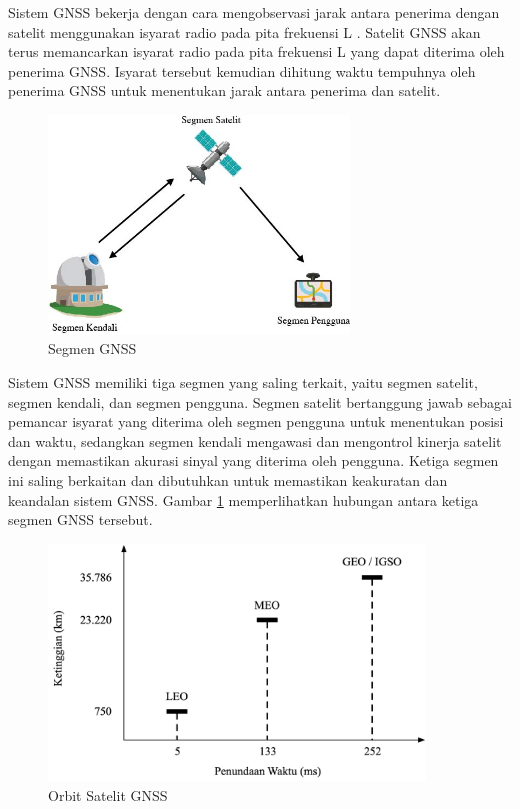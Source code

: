 Sistem GNSS bekerja dengan cara mengobservasi jarak antara penerima dengan satelit menggunakan isyarat radio pada pita frekuensi L \cite{TheEuropeanGlobalNavigationSatelliteSystemsAgency2021}. Satelit GNSS akan terus memancarkan isyarat radio pada pita frekuensi L yang dapat diterima oleh penerima GNSS. Isyarat tersebut kemudian dihitung waktu tempuhnya oleh penerima GNSS untuk menentukan jarak antara penerima dan satelit. 

\begin{figure}[H]
	\centering
	\includegraphics[width=8cm]{contents/chapter-2/gnss_segment.jpg}
	\caption{Segmen GNSS}
	\label{Fig: gnss_segment}
\end{figure}

Sistem GNSS memiliki tiga segmen yang saling terkait, yaitu segmen satelit, segmen kendali, dan segmen pengguna. Segmen satelit bertanggung jawab sebagai pemancar isyarat yang diterima oleh segmen pengguna untuk menentukan posisi dan waktu, sedangkan segmen kendali mengawasi dan mengontrol kinerja satelit dengan memastikan akurasi sinyal yang diterima oleh pengguna. Ketiga segmen ini saling berkaitan dan dibutuhkan untuk memastikan keakuratan dan keandalan sistem GNSS. Gambar \ref{Fig: gnss_segment} memperlihatkan hubungan antara ketiga segmen GNSS tersebut.

\begin{figure}[H]
	\centering
	\includegraphics[width=10cm]{contents/chapter-2/alt-comp.png}
	\caption{Orbit Satelit GNSS}
	\label{Fig: alt-comp}
\end{figure}

